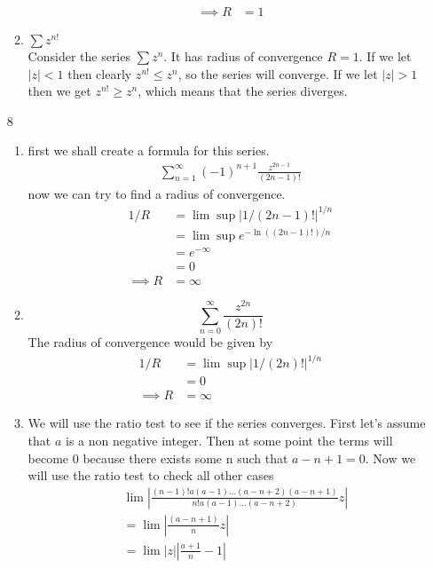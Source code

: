 \documentclass{article}
\begin{document}
\begin{enumerate}
\begin{enumerate}[label=(\roman*)]
\begin{align*}
          \implies R&=1
        \end{align*}
        \item $\sum z^{n!}$\\
        Consider the series $\sum z^n$. It has radius of convergence $R=1$. If we let $|z|<1$ then clearly $z^{n!}\leq z^n$, so the series will converge. If we let $|z|>1$ then we get $z^{n!}\geq z^n$, which means that the series diverges.
      \end{enumerate}
    \item[8]
      \begin{enumerate}[label=(\roman*)]
        \item
          first we shall create a formula for this series.
          \begin{align*}
            \sum_{n=1}^\infty (-1)^{n+1}\frac{z^{2n-1}}{(2n-1)!}
          \end{align*}
          now we can try to find a radius of convergence.
          \begin{align*}
            1/R&=\lim\sup |1/(2n-1)!|^{1/n}\\
            &=\lim\sup e^{-\ln((2n-1)!)/n}\\
            &=e^{-\infty}\\
            &=0\\
            \implies R&=\infty
          \end{align*}
        \item
          \[\sum_{n=0}^\infty \frac{z^{2n}}{(2n)!}\]
          The radius of convergence would be given by
          \begin{align*}
            1/R&=\lim\sup |1/(2n)!|^{1/n}\\
            &=0\\
            \implies R&=\infty
          \end{align*}
        \item
          We will use the ratio test to see if the series converges. First let's assume that $a$ is a non negative integer.
          Then at some point the terms will become 0 because there exists some n such that $a-n+1=0$.
          Now we will use the ratio test to check all other cases
          \begin{align*}
            &\lim|\frac{(n-1)!a(a-1)\dots(a-n+2)(a-n+1)}{n!a(a-1)\dots(a-n+2)}z|\\
            &=\lim|\frac{(a-n+1)}{n}z|\\
            &=\lim|z||\frac{a+1}{n}-1|\\

\end{align*}
\end{enumerate}
\end{enumerate}
\end{document}
